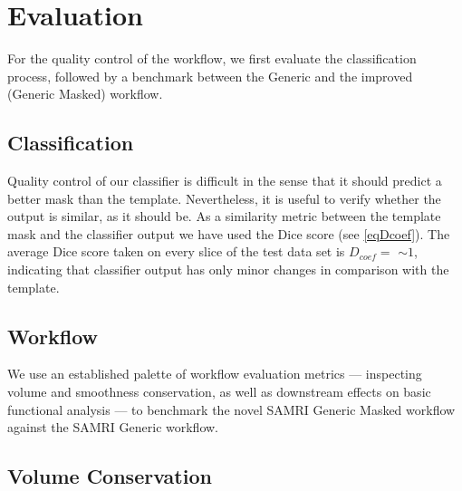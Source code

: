 \section{Evaluation}
For the quality control of the workflow, we first evaluate the classification process, followed by a benchmark between the Generic and the improved (Generic Masked) workflow.

\subsection{Classification}
Quality control of our classifier is difficult in the sense that it should predict a better mask than the template.
Nevertheless, it is useful to verify whether the output is similar, as it should be.
As a similarity metric between the template mask and the classifier output we have used the Dice score (see \cref{eqDcoef}).
The average Dice score taken on every slice of the test data set is $D_{coef}= $  $\sim 1$, indicating that classifier output has only minor changes in comparison with the template.

\begin{sansmath}
\end{sansmath}

\subsection{Workflow}
We use an established palette of workflow evaluation metrics --- inspecting volume and smoothness conservation, as well as downstream effects on basic functional analysis \cite{ioanas_optimized_2019} --- to benchmark the novel SAMRI Generic Masked workflow against the SAMRI Generic workflow.


\subsection{Volume Conservation}

